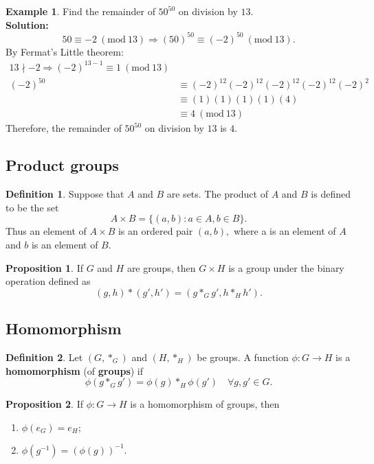 \documentclass[12pt, a4paper]{article}
\newcommand{\imply}{\Rightarrow}
\newcommand{\Mod}[1]{\ (\mathrm{mod}\ #1)}
\theoremstyle{definition}
\newtheorem{definition}{Definition}[section]
\newtheorem*{example}{Example}
\newtheorem{proposition}{Proposition}
\theoremstyle{plain}
\begin{document}
\begin{example}
Find the remainder of $50^{50}$ on division by $13.$ \\
\textbf{Solution:} $$50 \equiv -2 \Mod{13} \imply (50)^{50} \equiv (-2)^{50} \Mod{13}.$$ 
By Fermat's Little theorem: 
$$\begin{aligned}
13 \nmid -2 \imply (-2)^{13-1} \equiv 1 \Mod{13} \\
(-2)^{50} &\equiv (-2)^{12}(-2)^{12}(-2)^{12}(-2)^{12}(-2)^2 \\
&\equiv (1)(1)(1)(1)(4) \\
&\equiv 4 \Mod{13}
\end{aligned}$$
Therefore, the remainder of $50^{50}$ on division by $13$ is $4.$
\end{example}

\subsection{Product groups}

\begin{definition}
Suppose that $A$ and $B$ are sets. The product of $A$ and $B$ is defined to be the set 
$$A\times B =\{(a,b):a\in A, b\in B\}.$$ 
Thus an element of $A \times B$ is an ordered pair $(a, b),$ where a is an element of $A$ and $b$ is an element of $B.$
\end{definition}

\begin{proposition}
If $G$ and $H$ are groups, then $G \times H$ is a group under the binary operation defined as 
$$(g,h)*(g',h')=(g*_G g', h*_H h').$$
\end{proposition}

\subsection{Homomorphism}

\begin{definition}
Let $(G,*_G)$ and $(H,*_H)$ be groups. A function $\phi : G \to H$ is a \textbf{homomorphism} (of \textbf{groups}) if 
$$\phi(g*_G g')=\phi(g)*_H\phi(g') \quad \forall g,g'\in G.$$
\end{definition}

\begin{proposition}
If $\phi : G \to H$ is a homomorphism of groups, then
\begin{enumerate}
	
	\item $\phi(e_G)=e_H;$

	\item $\phi(g^{-1})=(\phi(g))^{-1}.$

\end{enumerate}
\end{proposition}
\end{document}

